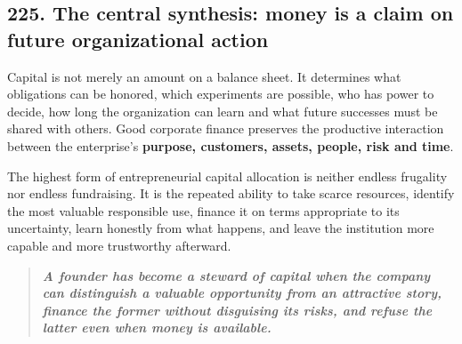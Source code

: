 \subsection{225. The central synthesis: money is a claim on future organizational action}


Capital is not merely an amount on a balance sheet. It determines what obligations can be honored, which experiments are possible, who has power to decide, how long the organization can learn and what future successes must be shared with others. Good corporate finance preserves the productive interaction between the enterprise's \textbf{purpose, customers, assets, people, risk and time}.

The highest form of entrepreneurial capital allocation is neither endless frugality nor endless fundraising. It is the repeated ability to take scarce resources, identify the most valuable responsible use, finance it on terms appropriate to its uncertainty, learn honestly from what happens, and leave the institution more capable and more trustworthy afterward.

\begin{quote}
\itshape
\textbf{A founder has become a steward of capital when the company can distinguish a valuable opportunity from an attractive story, finance the former without disguising its risks, and refuse the latter even when money is available.}
\end{quote}


